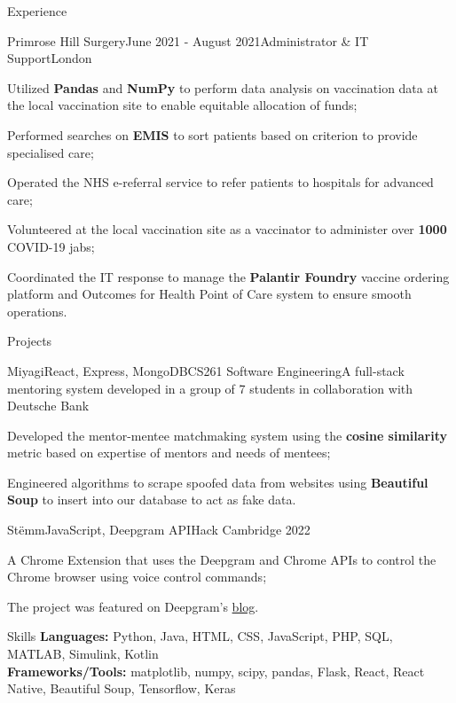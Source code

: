 \documentclass{resume}
\begin{document}
\begin{rSection}{Experience}
        \begin{rSubsection}{Primrose Hill Surgery}{June 2021 - August 2021}{Administrator \& IT Support}{London}{}
            \item Utilized \textbf{Pandas} and \textbf{NumPy} to perform data analysis on vaccination data at the local vaccination site to enable equitable allocation of funds;
            \item Performed searches on \textbf{EMIS} to sort patients based on criterion to provide specialised care;
            \item Operated the NHS e-referral service to refer patients to hospitals for advanced care;
            \item Volunteered at the local vaccination site as a vaccinator to administer over \textbf{1000} COVID-19 jabs;
            \item Coordinated the IT response to manage the \textbf{Palantir Foundry} vaccine ordering platform and Outcomes for Health Point of Care system to ensure smooth operations.
        \end{rSubsection}
    \end{rSection}

    \begin{rSection}{Projects}
        \begin{rSubsection}{Miyagi}{React, Express, MongoDB}{CS261 Software Engineering}{}{A full-stack mentoring system developed in a group of 7 students in collaboration with Deutsche Bank}
            \item Developed the mentor-mentee matchmaking system using the \textbf{cosine similarity} metric based on expertise of mentors and needs of mentees;
            \item Engineered algorithms to scrape spoofed data from websites using \textbf{Beautiful Soup} to insert into our database to act as fake data.
        \end{rSubsection}
        \begin{rSubsection}{Stëmm}{JavaScript, Deepgram API}{Hack Cambridge 2022}{}{}
            \item A Chrome Extension that uses the Deepgram and Chrome APIs to control the Chrome browser using voice control commands;
            \item The project was featured on Deepgram's \href{https://developers.deepgram.com/blog/2022/03/voice-control-browser-stemm/}{blog}. 
        \end{rSubsection}
    \end{rSection}
    \begin{rSection}{Skills}
        \textbf{Languages:} Python, Java, HTML, CSS, JavaScript, PHP, SQL, MATLAB, Simulink, Kotlin\\
        \textbf{Frameworks/Tools:} matplotlib, numpy, scipy, pandas, Flask, React, React Native, Beautiful Soup, Tensorflow, Keras \\ 
    \end{rSection}
\end{document}
